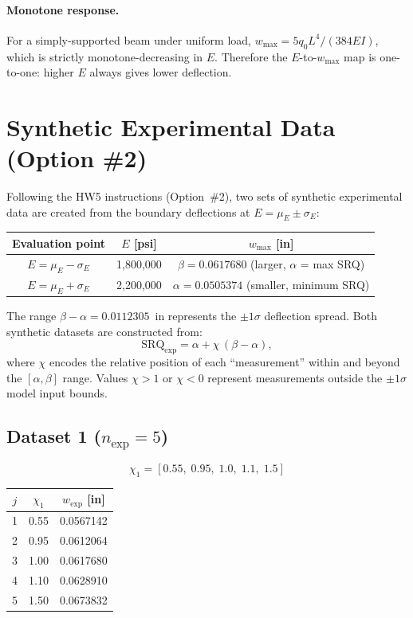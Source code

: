 \documentclass[11pt,letterpaper]{article}
\newcommand{\wmax}{w_{\max}}
\newcommand{\muE}{\mu_E}
\newcommand{\sigE}{\sigma_E}
\begin{document}
\paragraph{Monotone response.}
For a simply-supported beam under uniform load, $\wmax = 5q_0L^4/(384EI)$, which
is strictly monotone-decreasing in $E$.  Therefore the $E$-to-$\wmax$ map is
one-to-one: higher $E$ always gives lower deflection.

\section{Synthetic Experimental Data  (Option \#2)}
\label{sec:synth}

Following the HW5 instructions (Option~\#2), two sets of synthetic experimental
data are created from the boundary deflections at $E = \muE \pm \sigE$:

\begin{center}
\begin{tabular}{ccc}
  \toprule
  Evaluation point & $E$ [psi] & $\wmax$ [in] \\
  \midrule
  $E = \muE - \sigE$ & 1,800,000 & $\beta = 0.0617680$  (larger, $\alpha$ = max SRQ) \\
  $E = \muE + \sigE$ & 2,200,000 & $\alpha = 0.0505374$  (smaller, minimum SRQ) \\
  \bottomrule
\end{tabular}
\end{center}

The range $\beta - \alpha = 0.0112305$~in represents the $\pm 1\sigma$
deflection spread.  Both synthetic datasets are constructed from:
\begin{equation}
  \mathrm{SRQ}_{\mathrm{exp}} = \alpha + \chi\,(\beta - \alpha),
  \label{eq:synth}
\end{equation}
where $\chi$ encodes the relative position of each ``measurement'' within and
beyond the $[\alpha,\beta]$ range.  Values $\chi>1$ or $\chi<0$ represent
measurements outside the $\pm 1\sigma$ model input bounds.

\subsection*{Dataset 1 ($n_{\mathrm{exp}} = 5$)}

\[
  \chi_1 = [0.55,\; 0.95,\; 1.0,\; 1.1,\; 1.5]
\]

\begin{center}
\begin{tabular}{ccc}
  \toprule
  $j$ & $\chi_1$ & $w_{\mathrm{exp}}$ [in] \\
  \midrule
  1 & 0.55 & 0.0567142 \\
  2 & 0.95 & 0.0612064 \\
  3 & 1.00 & 0.0617680 \\
  4 & 1.10 & 0.0628910 \\
  5 & 1.50 & 0.0673832 \\
  \bottomrule
\end{tabular}
\end{center}
\end{document}

